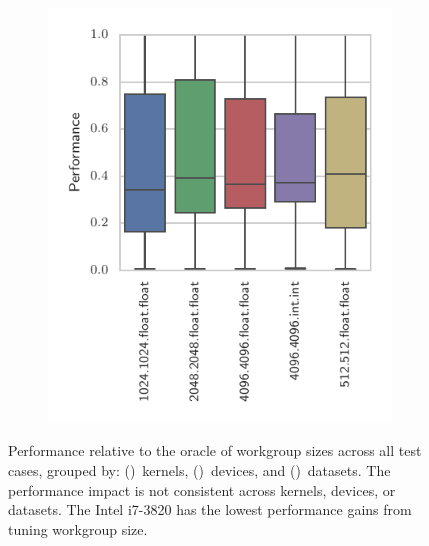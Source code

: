 \begin{figure}
{\begin{minipage}{.48\textwidth}
\begin{subfigure}[h]{.48\columnwidth}
      \vspace{-1.5em} %
      \caption{}
      \label{fig:performance-devices}
    \end{subfigure}
    ~%
    \begin{subfigure}[h]{.48\columnwidth}
      \centering
      \includegraphics[width=\columnwidth]{img/performance_datasets.pdf}
      \vspace{-1.5em} %
      \caption{}
      \label{fig:performance-datasets}
    \end{subfigure}
    \caption{%
      Performance relative to the oracle of workgroup sizes across all
      test cases, grouped by:
      ()~kernels,
      ()~devices, and
      ()~datasets. The performance
      impact is not consistent across kernels, devices, or datasets. The
      Intel i7-3820 has the lowest performance gains from tuning
      workgroup size.%
    }
    \label{fig:performances}
  \end{minipage}%
}
\end{figure}


